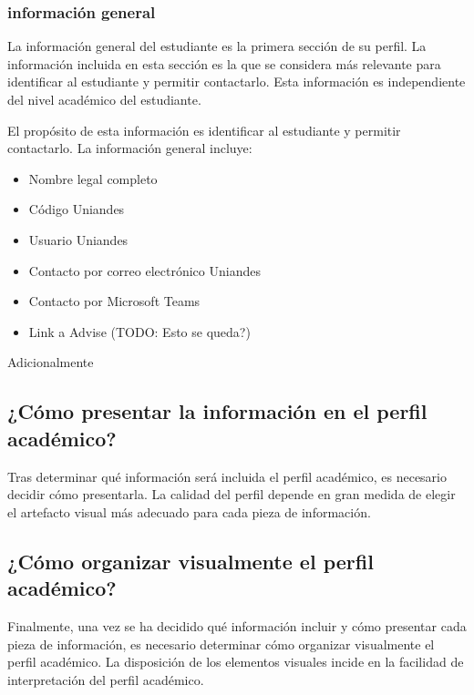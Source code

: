 \subsubsection{información general}

La información general del estudiante es la primera sección de su perfil. La información incluida en esta sección es la que se considera más relevante para identificar al estudiante y permitir contactarlo. Esta información es independiente del nivel académico del estudiante.


El propósito de esta información es identificar al estudiante y permitir contactarlo. La información general incluye:
\begin{itemize}
	\item Nombre legal completo
	\item Código Uniandes
	\item Usuario Uniandes
	\item Contacto por correo electrónico Uniandes
	\item Contacto por Microsoft Teams
	\item Link a Advise (TODO: Esto se queda?)
\end{itemize}

Adicionalmente



\subsection{¿Cómo presentar la información en el perfil académico?}



Tras determinar qué información será incluida el perfil académico, es necesario decidir cómo presentarla. La calidad del perfil depende en gran medida de elegir el artefacto visual más adecuado para cada pieza de información.





\subsection{¿Cómo organizar visualmente el perfil académico?}

Finalmente, una vez se ha decidido qué información incluir y cómo presentar cada pieza de información, es necesario determinar cómo organizar visualmente el perfil académico. La disposición de los elementos visuales incide en la facilidad de interpretación del perfil académico.







